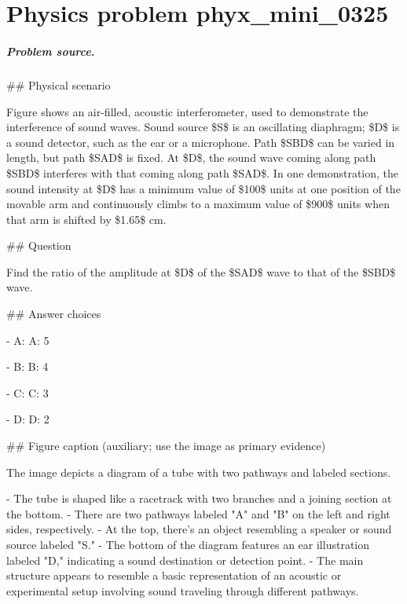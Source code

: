 
\chapter{Physics problem phyx\_mini\_0325}
\label{ch:PhyXMiniProblems_problem_phyx_mini_0325}

\paragraph{Problem source.}
\#\# Physical scenario

Figure shows an air-filled, acoustic interferometer, used to demonstrate the interference of sound waves. Sound source \$S\$ is an oscillating diaphragm; \$D\$ is a sound detector, such as the ear or a microphone. Path \$SBD\$ can be varied in length, but path \$SAD\$ is fixed. At \$D\$, the sound wave coming along path \$SBD\$ interferes with that coming along path \$SAD\$. In one demonstration, the sound intensity at \$D\$ has a minimum value of \$100\$ units at one position of the movable arm and continuously climbs to a maximum value of \$900\$ units when that arm is shifted by \$1.65\$ cm.

\#\# Question

Find the ratio of the amplitude at \$D\$ of the \$SAD\$ wave to that of the \$SBD\$ wave.

\#\# Answer choices

- A: A: 5

- B: B: 4

- C: C: 3

- D: D: 2

\#\# Figure caption (auxiliary; use the image as primary evidence)

The image depicts a diagram of a tube with two pathways and labeled sections. 

- The tube is shaped like a racetrack with two branches and a joining section at the bottom.
- There are two pathways labeled "A" and "B" on the left and right sides, respectively.
- At the top, there's an object resembling a speaker or sound source labeled "S."
- The bottom of the diagram features an ear illustration labeled "D," indicating a sound destination or detection point.
- The main structure appears to resemble a basic representation of an acoustic or experimental setup involving sound traveling through different pathways.

